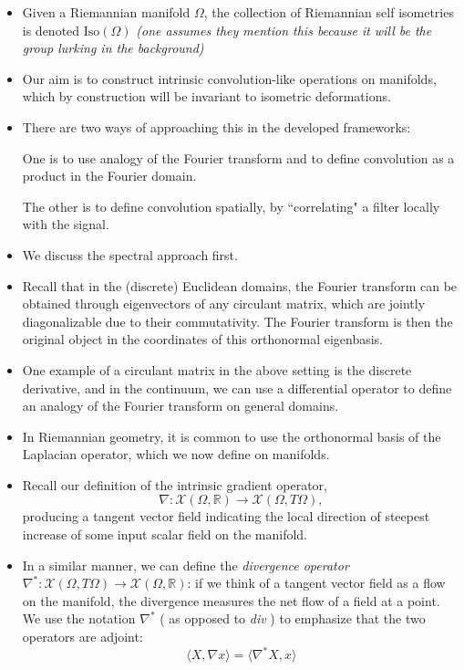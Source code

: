 \documentclass[12pt]{article}
\numberwithin{equation}{section}
\theoremstyle{definition}
\newcommand{		\ra		}	{	\rangle					}
\newcommand{		\la		}	{	\langle					}
\newcommand{		\Oh		}	{	\Omega					}
\newcommand{		\1		}	{	\bm{1}					}%
\begin{document}
\begin{itemize}

\item Given a Riemannian manifold $\Oh$, the collection of Riemannian self isometries is denoted $\textrm{Iso}(\Oh)$ \emph{(one assumes they mention this because it will be the group lurking in the background)}

\item Our aim is to construct intrinsic convolution-like operations on manifolds, which by construction will be invariant to isometric deformations. 

\item There are two ways of approaching this in the developed frameworks: 

\subitem One is to use analogy of the Fourier transform and to define convolution as a product in the Fourier domain. 

\subitem The other is to define convolution spatially, by ``correlating" a filter locally with the signal. 

\item We discuss the spectral approach first. 

\item Recall that in the (discrete) Euclidean domains, the Fourier transform can be obtained through eigenvectors of any circulant matrix, which are jointly diagonalizable due to their commutativity. The Fourier transform is then the original object in the coordinates of this orthonormal eigenbasis.

\item One example of a circulant matrix in the above setting is the discrete derivative, and in the continuum, we can use a differential operator to define an analogy of the Fourier transform on general domains. 

\item In Riemannian geometry, it is common to use the orthonormal basis of the Laplacian operator, which we now define on manifolds.

\item Recall our definition of the intrinsic gradient operator,
$$
\nabla : \mathcal{X}(\Omega, \mathbb{R}) \to \mathcal{X}(\Omega, T\Omega),
$$
producing a tangent vector field indicating the local direction of steepest increase of some input scalar field on the manifold. 

\item In a similar manner, we can define the \emph{divergence operator} $\nabla^* : \mathcal{X}( \Omega, T\Omega) \to \mathcal{X}(\Omega, \mathbb{R})$: if we think of a tangent vector field as a flow on the manifold, the divergence measures the net flow of a field at a point. We use the notation $\nabla^*$ ( as opposed to \emph{div} ) to emphasize that the two operators are adjoint: 
$$
\la  X, \nabla x \ra = \la \nabla^* X, x \ra
$$


\end{itemize}
\end{document}
